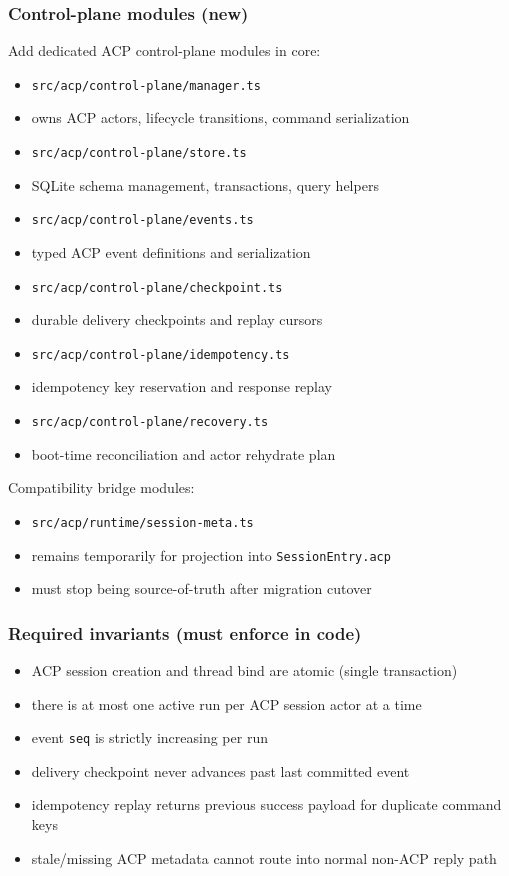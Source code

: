 \subsubsection{Control-plane modules (new)}


Add dedicated ACP control-plane modules in core:

\begin{itemize}
  \item \texttt{src/acp/control-plane/manager.ts}
  \item owns ACP actors, lifecycle transitions, command serialization
  \item \texttt{src/acp/control-plane/store.ts}
  \item SQLite schema management, transactions, query helpers
  \item \texttt{src/acp/control-plane/events.ts}
  \item typed ACP event definitions and serialization
  \item \texttt{src/acp/control-plane/checkpoint.ts}
  \item durable delivery checkpoints and replay cursors
  \item \texttt{src/acp/control-plane/idempotency.ts}
  \item idempotency key reservation and response replay
  \item \texttt{src/acp/control-plane/recovery.ts}
  \item boot-time reconciliation and actor rehydrate plan
\end{itemize}


Compatibility bridge modules:

\begin{itemize}
  \item \texttt{src/acp/runtime/session-meta.ts}
  \item remains temporarily for projection into \texttt{SessionEntry.acp}
  \item must stop being source-of-truth after migration cutover
\end{itemize}


\subsubsection{Required invariants (must enforce in code)}


\begin{itemize}
  \item ACP session creation and thread bind are atomic (single transaction)
  \item there is at most one active run per ACP session actor at a time
  \item event \texttt{seq} is strictly increasing per run
  \item delivery checkpoint never advances past last committed event
  \item idempotency replay returns previous success payload for duplicate command keys
  \item stale/missing ACP metadata cannot route into normal non-ACP reply path
\end{itemize}


